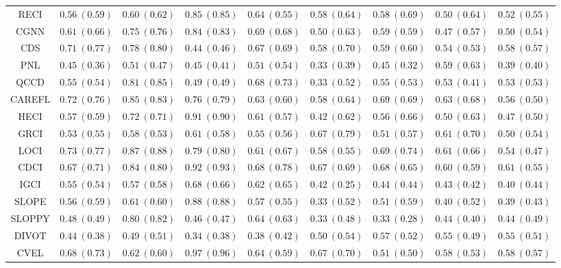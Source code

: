 \documentclass{article}
\theoremstyle{plain}
\theoremstyle{definition}
\theoremstyle{remark}
\begin{document}
{\begin{table}[!htbp]
\begin{center}
{\begin{tabular}{c|ccc|ccccc}
RECI& $0.56\ (0.59)$& $0.60\ (0.62)$& $0.85\ (0.85)$& $0.64\ (0.55)$& $0.58\ (0.64)$& $0.58\ (0.69)$& $0.50\ (0.64)$& $0.52\ (0.55)$ \\
CGNN& $0.61\ (0.66)$& $0.75\ (0.76)$& $0.84\ (0.83)$& $0.69\ (0.68)$& $0.50\ (0.63)$& $0.59\ (0.59)$& $0.47\ (0.57)$& $0.50\ (0.54)$ \\
CDS& $0.71\ (0.77)$& $0.78\ (0.80)$& $0.44\ (0.46)$& $0.67\ (0.69)$& $0.58\ (0.70)$& $0.59\ (0.60)$& $0.54\ (0.53)$& $0.58\ (0.57)$ \\
PNL& $0.45\ (0.36)$& $0.51\ (0.47)$& $0.45\ (0.41)$& $0.51\ (0.54)$& $0.33\ (0.39)$& $0.45\ (0.32)$& $0.59\ (0.63)$& $0.39\ (0.40)$ \\
QCCD& $0.55\ (0.54)$& $0.81\ (0.85)$& $0.49\ (0.49)$& $0.68\ (0.73)$& $0.33\ (0.52)$& $0.55\ (0.53)$& $0.53\ (0.41)$& $0.53\ (0.53)$ \\
CAREFL& $0.72\ (0.76)$& $0.85\ (0.83)$& $0.76\ (0.79)$& $0.63\ (0.60)$& $0.58\ (0.64)$& $0.69\ (0.69)$& $\bm{0.63}\ (0.68)$& $0.56\ (0.50)$ \\
HECI& $0.57\ (0.59)$& $0.72\ (0.71)$& $0.91\ (0.90)$& $0.61\ (0.57)$& $0.42\ (0.62)$& $0.56\ (0.66)$& $0.50\ (0.63)$& $0.47\ (0.50)$ \\
GRCI& $0.53\ (0.55)$& $0.58\ (0.53)$& $0.61\ (0.58)$& $0.55\ (0.56)$& $0.67\ (0.79)$& $0.51\ (0.57)$& $0.61\ (0.70)$& $0.50\ (0.54)$ \\
LOCI& $0.73\ (0.77)$& $0.87\ (0.88)$& $0.79\ (0.80)$& $0.61\ (0.67)$& $0.58\ (0.55)$& $0.69\ (0.74)$& $0.61\ (0.66)$& $0.54\ (0.47)$ \\
CDCI& $0.67\ (0.71)$& $0.84\ (0.80)$& $0.92\ (0.93)$& $0.68\ (0.78)$& $0.67\ (0.69)$& $0.68\ (0.65)$& $0.60\ (0.59)$& $0.61\ (0.55)$ \\
IGCI& $0.55\ (0.54)$& $0.57\ (0.58)$& $0.68\ (0.66)$& $0.62\ (0.65)$& $0.42\ (0.25)$& $0.44\ (0.44)$& $0.43\ (0.42)$& $0.40\ (0.44)$ \\
SLOPE& $0.56\ (0.59)$& $0.61\ (0.60)$& $0.88\ (0.88)$& $0.57\ (0.55)$& $0.33\ (0.52)$& $0.51\ (0.59)$& $0.40\ (0.52)$& $0.39\ (0.43)$ \\
SLOPPY& $0.48\ (0.49)$& $0.80\ (0.82)$& $0.46\ (0.47)$& $0.64\ (0.63)$& $0.33\ (0.48)$& $0.33\ (0.28)$& $0.44\ (0.40)$& $0.44\ (0.49)$ \\
DIVOT& $0.44\ (0.38)$& $0.49\ (0.51)$& $0.34\ (0.38)$& $0.38\ (0.42)$& $0.50\ (0.54)$& $0.57\ (0.52)$& $0.55\ (0.49)$& $0.55\ (0.51)$ \\
CVEL& $0.68\ (0.73)$& $0.62\ (0.60)$& $\bm{0.97}\ (0.96)$& $0.64\ (0.59)$& $0.67\ (0.70)$& $0.51\ (0.50)$& $0.58\ (0.53)$& $0.58\ (0.57)$ \\

\end{tabular}}
\end{center}
\end{table}}
\end{document}
